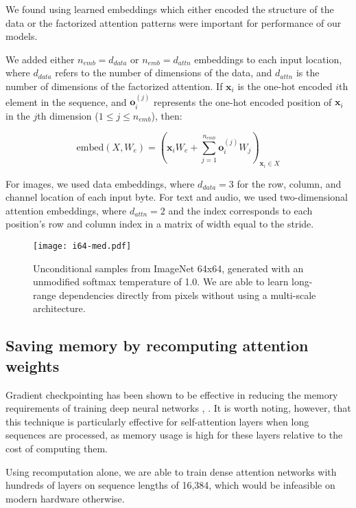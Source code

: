 \documentclass{article}
\begin{document}
We found using learned embeddings which either encoded the structure of the data or the factorized attention patterns were important for performance of our models. 

We added either $n_{emb} = d_{data}$ or $n_{emb} = d_{attn}$ embeddings to each input location, where $d_{data}$ refers to the number of dimensions of the data, and $d_{attn}$ is the number of dimensions of the factorized attention. If $\mathbf{x}_i$ is the one-hot encoded $i$th element in the sequence, and $\mathbf{o}_{i}^{(j)}$ represents the one-hot encoded position of $\mathbf{x}_i$ in the $j$th dimension ($1 \le j \le n_{emb}$), then:

\begin{equation}
\mathrm{embed}(X, W_e) = \left(\mathbf{x}_iW_e + \sum_{j=1}^{n_{emb}} \mathbf{o}_{i}^{(j)} W_{j} \right)_{\mathbf{x}_i \in X}
\end{equation}


For images, we used data embeddings, where $d_{data} = 3$ for the row, column, and channel location of each input byte. For text and audio, we used two-dimensional attention embeddings, where $d_{attn} = 2$ and the index corresponds to each position's row and column index in a matrix of width equal to the stride.

\begin{figure*}[t]
\centering
\setlength\fboxsep{0pt}
\setlength\fboxrule{0.25pt}
\texttt{[image: i64-med.pdf]}
\caption{Unconditional samples from ImageNet 64x64, generated with an unmodified softmax temperature of 1.0. We are able to learn long-range dependencies directly from pixels without using a multi-scale architecture.}
\label{inet64image}
\end{figure*}

\subsection{Saving memory by recomputing attention weights}
Gradient checkpointing has been shown to be effective in reducing the memory requirements of training deep neural networks \cite{chen2016training}, \cite{gruslys2016memory}. It is worth noting, however, that this technique is particularly effective for self-attention layers when long sequences are processed, as memory usage is high for these layers relative to the cost of computing them.

Using recomputation alone, we are able to train dense attention networks with hundreds of layers on sequence lengths of 16,384, which would be infeasible on modern hardware otherwise.
\end{document}
